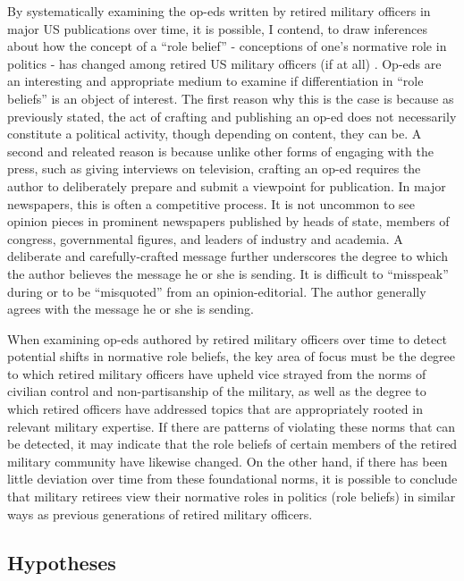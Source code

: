 \documentclass[12pt,]{article}
\begin{document}
\doublespacing

By systematically examining the op-eds written by retired military officers in major US publications over time, it is possible, I contend, to draw inferences about how the concept of a ``role belief'' - conceptions of one's normative role in politics - has changed among retired US military officers (if at all) \autocite{fitch_armed_1998}. Op-eds are an interesting and appropriate medium to examine if differentiation in ``role beliefs'' is an object of interest. The first reason why this is the case is because as previously stated, the act of crafting and publishing an op-ed does not necessarily constitute a political activity, though depending on content, they can be. A second and releated reason is because unlike other forms of engaging with the press, such as giving interviews on television, crafting an op-ed requires the author to deliberately prepare and submit a viewpoint for publication. In major newspapers, this is often a competitive process. It is not uncommon to see opinion pieces in prominent newspapers published by heads of state, members of congress, governmental figures, and leaders of industry and academia. A deliberate and carefully-crafted message further underscores the degree to which the author believes the message he or she is sending. It is difficult to ``misspeak'' during or to be ``misquoted'' from an opinion-editorial. The author generally agrees with the message he or she is sending.

When examining op-eds authored by retired military officers over time to detect potential shifts in normative role beliefs, the key area of focus must be the degree to which retired military officers have upheld vice strayed from the norms of civilian control and non-partisanship of the military, as well as the degree to which retired officers have addressed topics that are appropriately rooted in relevant military expertise. If there are patterns of violating these norms that can be detected, it may indicate that the role beliefs of certain members of the retired military community have likewise changed. On the other hand, if there has been little deviation over time from these foundational norms, it is possible to conclude that military retirees view their normative roles in politics (role beliefs) in similar ways as previous generations of retired military officers.

\hypertarget{hypotheses}{%
\subsection{Hypotheses}\label{hypotheses}}
\end{document}
